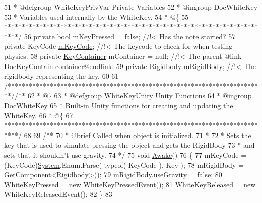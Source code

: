 \begin{DoxyCodeInclude}
51 \textcolor{comment}{     * @defgroup WhiteKeyPrivVar Private Variables}
52 \textcolor{comment}{     * @ingroup DocWhiteKey}
53 \textcolor{comment}{     * Variables used internally by the WhiteKey.}
54 \textcolor{comment}{     * @\{}
55 \textcolor{comment}{     ****************************************************************************/}
56     \textcolor{keyword}{private} \textcolor{keywordtype}{bool} mKeyPressed = \textcolor{keyword}{false}; \textcolor{comment}{//!< Has the note started?}
57 \textcolor{comment}{}    \textcolor{keyword}{private} KeyCode \hyperlink{group___white_key_priv_var_gaeb8c5eafd138c45894858554f739eaf7}{mKeyCode}; \textcolor{comment}{//!< The keycode to check for when testing physics.}
58 \textcolor{comment}{}    \textcolor{keyword}{private} \hyperlink{class_key_container}{KeyContainer} mContainer = null; \textcolor{comment}{//!< The parent @link DocKeyContain
       container@endlink.}
59 \textcolor{comment}{}    \textcolor{keyword}{private} Rigidbody \hyperlink{group___white_key_priv_var_gadc6bd637ef5229f7519b213f038ca15d}{mRigidBody}; \textcolor{comment}{//!< The rigidbody representing the key.}
60 \textcolor{comment}{}
61     \textcolor{comment}{/*************************************************************************/}\textcolor{comment}{/** }
62 \textcolor{comment}{     * @\}}
63 \textcolor{comment}{     * @defgroup WhiteKeyUnity Unity Functions}
64 \textcolor{comment}{     * @ingroup DocWhiteKey}
65 \textcolor{comment}{     * Built-in Unity functions for creating and updating the WhiteKey.}
66 \textcolor{comment}{     * @\{}
67 \textcolor{comment}{     ****************************************************************************/}
68 \textcolor{comment}{}
69 \textcolor{comment}{    /**}
70 \textcolor{comment}{     * @brief Called when object is initialized.}
71 \textcolor{comment}{     * }
72 \textcolor{comment}{     * Sets the key that is used to simulate pressing the object and gets the RigidBody}
73 \textcolor{comment}{     * and sets that it shouldn't use gravity.}
74 \textcolor{comment}{     */}
75     \textcolor{keywordtype}{void} \hyperlink{group___white_key_unity_ga92c78e57e0ccc8cf2dec655676698b21}{Awake}()
76     \{
77         mKeyCode = (KeyCode)\hyperlink{namespace_system}{System}.Enum.Parse( typeof( KeyCode ), Key );
78         mRigidBody = GetComponent<Rigidbody>();
79         mRigidBody.useGravity = \textcolor{keyword}{false};
80         WhiteKeyPressed = \textcolor{keyword}{new} WhiteKeyPressedEvent();
81         WhiteKeyReleased = \textcolor{keyword}{new} WhiteKeyReleasedEvent();
82     \}
83 \textcolor{comment}{}

\end{DoxyCodeInclude}
